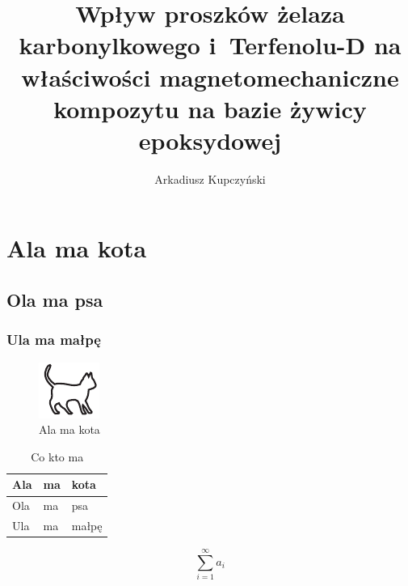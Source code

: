\documentclass[magister]{dyplom}
\author{Arkadiusz Kupczyński}
\title{Wpływ proszków żelaza karbonylkowego i~Terfenolu-D na właściwości magnetomechaniczne kompozytu na bazie żywicy epoksydowej}
\begin{document}
\maketitle

\tableofcontents

\listoffigures

\listoftables


\chapter{Ala ma kota}

\lipsum[1]

\section{Ola ma psa}

\lipsum[2-3]

\subsection{Ula ma małpę}

\lipsum[4-10]

\begin{figure}
\includegraphics[width=.4\textwidth]{kotek}
\caption{Ala ma kota}
\end{figure}

\lipsum[11-15]

\begin{table}
\caption{Co kto ma \cite{harel_rzecz_2008}}
\begin{tabular}{|l|l|l|}
\hline
Ala & ma & kota \\
\hline
Ola & ma & psa \\
\hline
Ula & ma & małpę\\
\hline
\end{tabular}
\end{table}

\lipsum[16-20]

\begin{equation}
\sum_{i=1}^{\infty}a_i
\end{equation}

\nocite{*}


\end{document}
